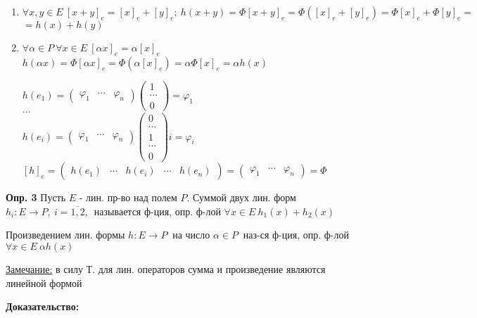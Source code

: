 \begin{enumerate}
 \item $\forall x,y \in E\ [x+y]_e = [x]_e + [y]_e;\ h(x+y) = \Phi[x+y]_e = \Phi([x]_e + [y]_e) = \Phi[x]_e + \Phi[y]_e =$\\$= h(x) + h(y)$
 \item $\forall \alpha \in P\ \forall x \in E\ [\alpha x]_e = \alpha[x]_e$\\
    $h(\alpha x) = \Phi[\alpha x]_e = \Phi(\alpha [x]_e) = \alpha \Phi[x]_e = \alpha h(x)$

    $h(e_1) = \begin{pmatrix} \varphi_1 & \cdots & \varphi_n \end{pmatrix} \begin{pmatrix} 1 \\ \cdots \\ 0 \end{pmatrix} = \varphi_1$\\
    $\ldots$\\
    $h(e_i) = \begin{pmatrix} \varphi_1 & \cdots & \varphi_n \end{pmatrix} \begin{pmatrix} 0 \\ \cdots \\ 1 \\ \cdots \\ 0 \end{pmatrix} i = \varphi_i $\\

    $[h]_e = \begin{pmatrix} h(e_1) & \cdots & h(e_i) & \cdots & h(e_n) \end{pmatrix} = \begin{pmatrix} \varphi_1 & \cdots & \varphi_n \end{pmatrix} = \Phi$
\end{enumerate}

\textbf{Опр. 3} Пусть $E$ - лин. пр-во над полем $P$. Суммой двух лин. форм $h_i : E \to P,\ i=\overline{1,2},$\ называется ф-ция, опр. ф-лой $\forall x \in E\ h_1(x) + h_2(x)$

Произведением лин. формы $h : E \to P\ $ на число $\alpha \in P\ $ наз-ся ф-ция, опр. ф-лой $\forall x\in E\ \alpha h(x)$

\underline{Замечание:} в силу Т. для лин. операторов сумма и произведение являются линейной формой

\textbf{Доказательство:} %
\\

